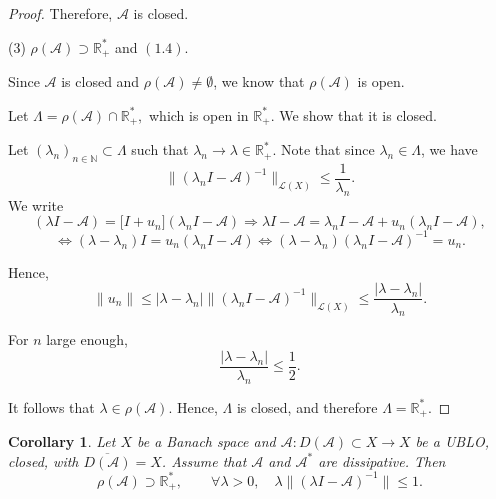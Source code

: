 \documentclass[12pt, oneside]{book}
\newtheorem{coro}{Corollary}[section]
\begin{document}
\begin{proof}
Therefore, $\mathscr{A}$ is closed.



(3) $\rho(\mathscr{A}) \supset \mathbb{R}_+^*$ and $(1.4)$.

\medskip

Since $\mathscr{A}$ is closed and $\rho(\mathscr{A}) \neq \emptyset$,
we know that $\rho(\mathscr{A})$ is open.

\medskip

Let
$
\Lambda = \rho(\mathscr{A}) \cap \mathbb{R}_+^*,
$
which is open in $\mathbb{R}_+^*$.
We show that it is closed.

\medskip

Let $(\lambda_n)_{n \in \mathbb{N}} \subset \Lambda$
such that
$
\lambda_n \longrightarrow \lambda \in \mathbb{R}_+^*.
$
Note that since $\lambda_n \in \Lambda$, we have
\[
\|(\lambda_n I - \mathscr{A})^{-1}\|_{\mathcal{L}(X)}
\le \frac{1}{\lambda_n}.
\]
We write
\[
(\lambda I - \mathscr{A})
= \bigl[I + u_n\bigr](\lambda_n I - \mathscr{A})
\Longrightarrow
\lambda I - \mathscr{A}
= \lambda_n I - \mathscr{A} + u_n(\lambda_n I - \mathscr{A}),
\]
\[
\Longleftrightarrow
(\lambda - \lambda_n)I = u_n(\lambda_n I - \mathscr{A})
\Longleftrightarrow
(\lambda - \lambda_n)(\lambda_n I - \mathscr{A})^{-1} = u_n.
\]

Hence,
\[
\|u_n\|
\le |\lambda - \lambda_n|
\|(\lambda_n I - \mathscr{A})^{-1}\|_{\mathcal{L}(X)}
\le \frac{|\lambda - \lambda_n|}{\lambda_n}.
\]

\medskip

For $n$ large enough,
\[
\frac{|\lambda - \lambda_n|}{\lambda_n} \le \frac{1}{2}.
\]

\medskip

It follows that $\lambda \in \rho(\mathscr{A})$.
Hence, $\Lambda$ is closed, and therefore
$
\Lambda = \mathbb{R}_+^*.
$

\end{proof}
\begin{coro}
	Let $X$ be a Banach space and
	$
	\mathscr{A} : D(\mathscr{A}) \subset X \longrightarrow X
	$
	be a UBLO, closed, with $\overline{D(\mathscr{A})}=X$. Assume that $\mathscr{A}$ and $\mathscr{A}^*$ are dissipative. Then
	\[
	\rho(\mathscr{A}) \supset \mathbb{R}_+^*,
	\qquad
	\forall \lambda > 0,
	\quad
	\lambda \|(\lambda I - \mathscr{A})^{-1}\| \le 1.
	\]
\end{coro}
\end{document}
